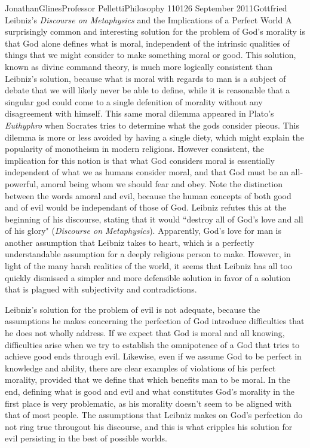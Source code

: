 \documentclass[12pt,letterpaper]{article}
\begin{document}
\begin{mla}{Jonathan}{Glines}{Professor Pelletti}{Philosophy 1101}{26 September 2011}{Gottfried Leibniz's \textit{Discourse on Metaphysics} and the Implications of a Perfect World}
A surprisingly common and interesting solution for the problem of God's morality is that God alone defines what is moral, independent of the intrinsic qualities of things that we might consider to make something moral or good. This solution, known as divine command theory, is much more logically consistent than Leibniz's solution, because what is moral with regards to man is a subject of debate that we will likely never be able to define, while it is reasonable that a singular god could come to a single defenition of morality without any disagreement with himself. This same moral dilemma appeared in Plato's \textit{Euthyphro} when Socrates tries to determine what the gods consider pieous. This dilemma is more or less avoided by having a single diety, which might explain the popularity of monotheism in modern religions. However consistent, the implication for this notion is that what God considers moral is essentially independent of what we as humans consider moral, and that God must be an all-powerful, amoral being whom we should fear and obey. Note the distinction between the words amoral and evil, because the human concepts of both good and of evil would be independant of those of God. Leibniz refutes this at the beginning of his discourse, stating that it would ``destroy all of God's love and all of his glory" (\textit{Discourse on Metaphysics}). Apparently, God's love for man is another assumption that Leibniz takes to heart, which is a perfectly understandable assumption for a deeply religious person to make. However, in light of the many harsh realities of the world, it seems that Leibniz has all too quickly dismissed a simpler and more defensible solution in favor of a solution that is plagued with subjectivity and contradictions.

Leibniz's solution for the problem of evil is not adequate, because the assumptions he makes concerning the perfection of God introduce difficulties that he does not wholly address. If we expect that God is moral and all knowing, difficulties arise when we try to establish the omnipotence of a God that tries to achieve good ends through evil. Likewise, even if we assume God to be perfect in knowledge and ability, there are clear examples of violations of his perfect morality, provided that we define that which benefits man to be moral. In the end, defining what is good and evil and what constitutes God's morality in the first place is very problematic, as his morality doesn't seem to be aligned with that of most people. The assumptions that Leibniz makes on God's perfection do not ring true througout his discourse, and this is what cripples his solution for evil persisting in the best of possible worlds.


%
%
%
\end{mla}
\end{document}
